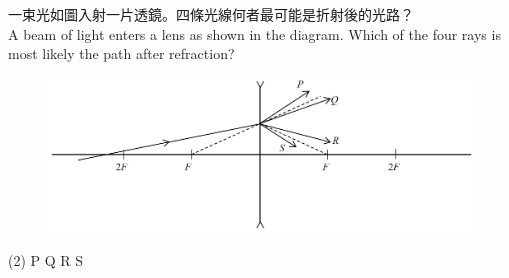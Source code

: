 \documentclass[beamer=true]{standalone}
\begin{document}














\begin{eg}
    一束光如圖入射一片透鏡。四條光線何者最可能是折射後的光路？\\A beam of light enters a lens as shown in the diagram. Which of the four rays is most likely the path after refraction?
    \begin{figure}
        \centering
        \includegraphics[width=1\linewidth]{assets/duqnu89n3.png}


    \end{figure}
    \begin{tasks}[before-skip=0em]
        (2)
        \task P
        \task Q
        \task R
        \task S
    \end{tasks}
\end{eg}
\end{document}
